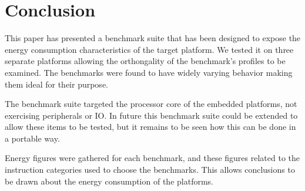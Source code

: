\documentclass[twocolumn]{article}
\newcommand{\todo}[1]{\textbf{\textcolor{red}{#1}}}
\begin{document}


\section{Conclusion}

This paper has presented a benchmark suite that has been designed to expose the energy consumption characteristics of the target platform. We tested it on three separate platforms allowing the orthongality of the benchmark's profiles to be examined. The benchmarks were found to have widely varying behavior making them ideal for their purpose.

The benchmark suite targeted the processor core of the embedded platforms, not exercising peripherals or IO. In future this benchmark suite could be extended to allow these items to be tested, but it remains to be seen how this can be done in a portable way.

Energy figures were gathered for each benchmark, and these figures related to the instruction categories used to choose the benchmarks. This allows conclusions to be drawn about the energy consumption of the platforms.

\printbibliography
\end{document}
